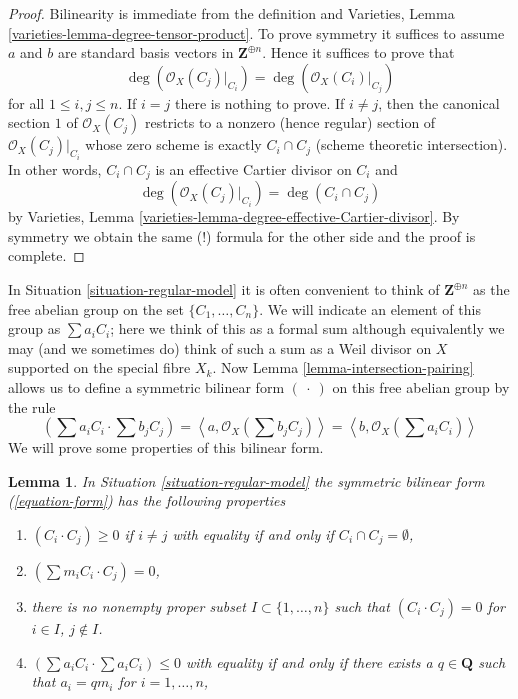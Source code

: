 \documentclass{stacks-project}
\theoremstyle{plain}
\newtheorem{lemma}[subsection]{Lemma}
\theoremstyle{definition}
\theoremstyle{remark}
\numberwithin{equation}{subsection}
\begin{document}
\begin{proof}
Bilinearity is immediate from the definition and
Varieties, Lemma \ref{varieties-lemma-degree-tensor-product}.
To prove symmetry it suffices to assume $a$ and $b$ are
standard basis vectors in $\mathbf{Z}^{\oplus n}$.
Hence it suffices to prove that
$$
\deg(\mathcal{O}_X(C_j)|_{C_i}) = \deg(\mathcal{O}_X(C_i)|_{C_j})
$$
for all $1 \leq i, j \leq n$. If $i = j$ there is nothing to prove.
If $i \not = j$, then the canonical section $1$ of $\mathcal{O}_X(C_j)$
restricts to a nonzero (hence regular) section of $\mathcal{O}_X(C_j)|_{C_i}$
whose zero scheme is exactly $C_i \cap C_j$ (scheme theoretic intersection).
In other words, $C_i \cap C_j$ is an effective Cartier divisor on $C_i$
and
$$
\deg(\mathcal{O}_X(C_j)|_{C_i}) = \deg(C_i \cap C_j)
$$
by Varieties, Lemma \ref{varieties-lemma-degree-effective-Cartier-divisor}.
By symmetry we obtain the same (!) formula for the other side
and the proof is complete.
\end{proof}

\noindent
In Situation \ref{situation-regular-model} it is often convenient to think
of $\mathbf{Z}^{\oplus n}$ as the free abelian group on the set
$\{C_1, \ldots, C_n\}$. We will indicate an element of this group
as $\sum a_i C_i$; here we think of this as a formal sum although
equivalently we may (and we sometimes do)
think of such a sum as a Weil divisor on $X$
supported on the special fibre $X_k$. Now
Lemma \ref{lemma-intersection-pairing}
allows us to define a symmetric bilinear form $(\ \cdot\ )$
on this free abelian group by the rule
\begin{equation}
\label{equation-form}
\left(\sum a_i C_i \cdot \sum b_j C_j\right) =
\left\langle a, \mathcal{O}_X(\sum b_j C_j) \right\rangle =
\left\langle b, \mathcal{O}_X(\sum a_i C_i) \right\rangle
\end{equation}
We will prove some properties of this bilinear form.

\begin{lemma}
\label{lemma-properties-form}
In Situation \ref{situation-regular-model} the symmetric bilinear form
(\ref{equation-form}) has the following properties
\begin{enumerate}
\item $(C_i \cdot C_j) \geq 0$ if $i \not = j$ with equality if and only
if $C_i \cap C_j = \emptyset$,
\item $(\sum m_i C_i \cdot C_j) = 0$,
\item there is no nonempty proper subset $I \subset \{1, \ldots, n\}$
such that $(C_i \cdot C_j) = 0$ for $i \in I$, $j \not \in I$.
\item $(\sum a_i C_i \cdot \sum a_i C_i) \leq 0$ with equality if and
only if there exists a $q \in \mathbf{Q}$ such that $a_i = qm_i$
for $i = 1, \ldots, n$,
\end{enumerate}
\end{lemma}
\end{document}
